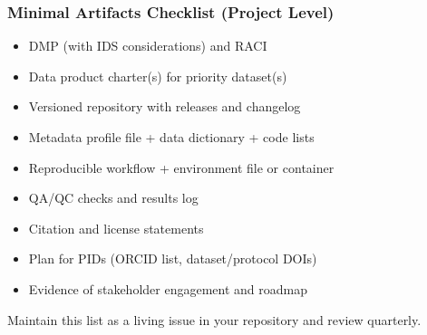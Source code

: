 \documentclass[
  letterpaper,
  DIV=11,
  numbers=noendperiod]{scrartcl}
\providecommand{\tightlist}{%
  \setlength{\itemsep}{0pt}\setlength{\parskip}{0pt}}
\begin{document}
\subsubsection{Minimal Artifacts Checklist (Project
Level)}\label{minimal-artifacts-checklist-project-level}

\begin{itemize}
\tightlist
\item[$\square$]
  DMP (with IDS considerations) and RACI
\item[$\square$]
  Data product charter(s) for priority dataset(s)
\item[$\square$]
  Versioned repository with releases and changelog
\item[$\square$]
  Metadata profile file + data dictionary + code lists
\item[$\square$]
  Reproducible workflow + environment file or container
\item[$\square$]
  QA/QC checks and results log
\item[$\square$]
  Citation and license statements
\item[$\square$]
  Plan for PIDs (ORCID list, dataset/protocol DOIs)
\item[$\square$]
  Evidence of stakeholder engagement and roadmap
\end{itemize}

Maintain this list as a living issue in your repository and review
quarterly.
\end{document}
